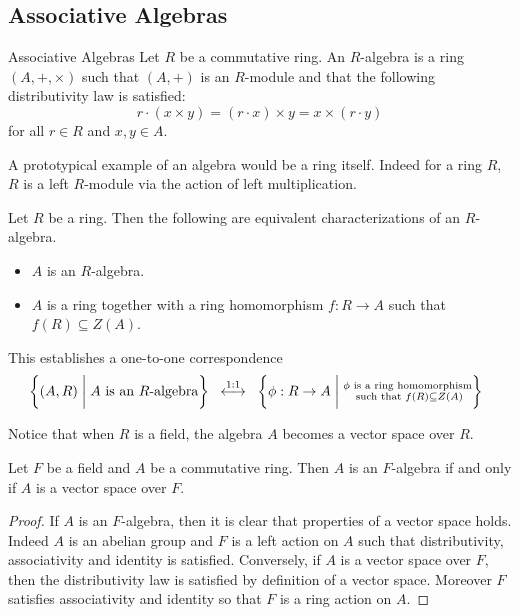\documentclass[a4paper]{article}
\begin{document}
\subsection{Associative Algebras}
\begin{defn}{Associative Algebras}{} Let $R$ be a commutative ring. An $R$-algebra is a ring $(A,+,\times)$ such that $(A,+)$ is an $R$-module and that the following distributivity law is satisfied: $$r\cdot(x\times y)=(r\cdot x)\times y=x\times(r\cdot y)$$ for all $r\in R$ and $x,y\in A$. 
\end{defn}

A prototypical example of an algebra would be a ring itself. Indeed for a ring $R$, $R$ is a left $R$-module via the action of left multiplication. 

\begin{prp}{}{} Let $R$ be a ring. Then the following are equivalent characterizations of an $R$-algebra. 
\begin{itemize}
\item $A$ is an $R$-algebra. 
\item $A$ is a ring together with a ring homomorphism $f:R\to A$ such that $f(R)\subseteq Z(A)$. 
\end{itemize}
\end{prp}

This establishes a one-to-one correspondence $$\left\{(A,R)\;\bigg{|}\;A\text{ is an }R\text{-algebra}\right\}\;\;\overset{1:1}{\longleftrightarrow}\;\;\left\{\phi:R\to A\;\bigg{|}\;\substack{\phi\text{ is a ring homomorphism}\\\text{ such that }f(R)\subseteq Z(A)}\right\}\;\;$$

Notice that when $R$ is a field, the algebra $A$ becomes a vector space over $R$. 

\begin{lmm}{}{} Let $F$ be a field and $A$ be a commutative ring. Then $A$ is an $F$-algebra if and only if $A$ is a vector space over $F$. \tcbline
\begin{proof}
If $A$ is an $F$-algebra, then it is clear that properties of a vector space holds. Indeed $A$ is an abelian group and $F$ is a left action on $A$ such that distributivity, associativity and identity is satisfied. Conversely, if $A$ is a vector space over $F$, then the distributivity law is satisfied by definition of a vector space. Moreover $F$ satisfies associativity and identity so that $F$ is a ring action on $A$. 
\end{proof}
\end{lmm}
\end{document}
